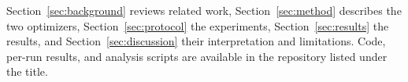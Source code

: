 Section~\ref{sec:background} reviews related work, Section~\ref{sec:method}
describes the two optimizers, Section~\ref{sec:protocol} the experiments,
Section~\ref{sec:results} the results, and Section~\ref{sec:discussion} their
interpretation and limitations. Code, per-run results, and analysis scripts are
available in the repository listed under the title.
